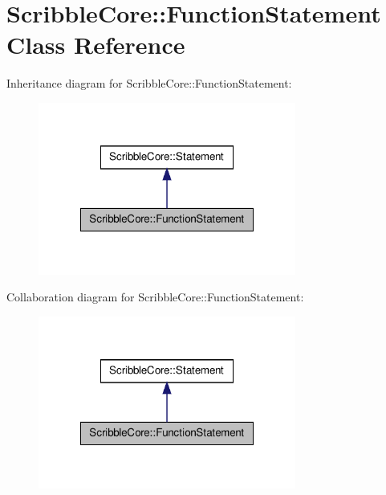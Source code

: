 \hypertarget{class_scribble_core_1_1_function_statement}{\section{Scribble\-Core\-:\-:Function\-Statement Class Reference}
\label{class_scribble_core_1_1_function_statement}
}


Inheritance diagram for Scribble\-Core\-:\-:Function\-Statement\-:
\nopagebreak
\begin{figure}[H]
\begin{center}
\leavevmode
\includegraphics[width=240pt]{class_scribble_core_1_1_function_statement__inherit__graph}
\end{center}
\end{figure}


Collaboration diagram for Scribble\-Core\-:\-:Function\-Statement\-:
\nopagebreak
\begin{figure}[H]
\begin{center}
\leavevmode
\includegraphics[width=240pt]{class_scribble_core_1_1_function_statement__coll__graph}
\end{center}
\end{figure}
